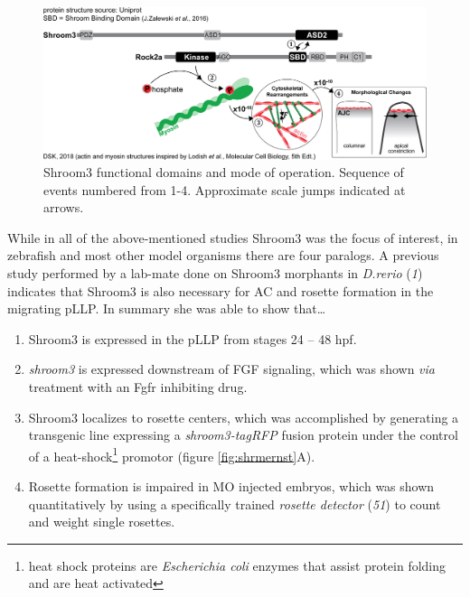 \documentclass[11pt,singlespacinge,twoside]{reedthesis} %
\providecommand{\tightlist}{%
  \setlength{\itemsep}{0pt}\setlength{\parskip}{0pt}}
\theoremstyle{definition}
\theoremstyle{definition}
\theoremstyle{definition}
\theoremstyle{remark}
\begin{document}
\begin{figure}

{\centering \includegraphics[width=0.95\linewidth]{figures/intro/shrm3_interaction} 

}

\caption[Shroom3 functional domains and mode of operation]{Shroom3 functional domains and mode of operation. Sequence of events numbered from 1-4. Approximate scale jumps indicated at arrows.}\label{fig:shrminteract}
\end{figure}
While in all of the above-mentioned studies Shroom3 was the focus of interest, in zebrafish and most other model organisms there are four paralogs. A previous study performed by a lab-mate done on Shroom3 morphants in \emph{D.rerio} (\emph{1}) indicates that Shroom3 is also necessary for AC and rosette formation in the migrating pLLP. In summary she was able to show that\ldots{}
\begin{enumerate}
\def\labelenumi{\arabic{enumi}.}
\tightlist
\item
  Shroom3 is expressed in the pLLP from stages 24 -- 48 hpf.
\item
  \emph{shroom3} is expressed downstream of FGF signaling, which was shown \emph{via} treatment with an Fgfr inhibiting drug.
\item
  Shroom3 localizes to rosette centers, which was accomplished by generating a transgenic line expressing a \emph{shroom3-tagRFP} fusion protein under the control of a heat-shock\footnote{heat shock proteins are \emph{Escherichia coli} enzymes that assist protein folding and are heat activated} promotor (figure \ref{fig:shrmernst}A).
\item
  Rosette formation is impaired in MO injected embryos, which was shown quantitatively by using a specifically trained \emph{rosette detector} (\emph{51}) to count and weight single rosettes.
\end{enumerate}
\end{document}
